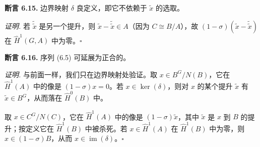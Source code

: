 \textbf{断言 6.15.} 边界映射 $\delta$ 良定义，即它不依赖于 $\tilde x$ 的选取。

\textit{证明.} 若 $\tilde{\tilde x}$ 是另一个提升，则 $\tilde x-\tilde{\tilde x}\in A$（因为 $C\cong B/A$），故 $(1-\sigma)(\tilde x-\tilde{\tilde x})$ 在 $\widehat H^1(G,A)$ 中为零。\hfill$\square$

\textbf{断言 6.16.} 序列 (6.5) 可延展为正合的。

\textit{证明.} 与前面一样，我们只在边界映射处验证。取 $x\in B^G/N(B)$，它在 $\widehat H^1(A)$ 中的像是 $(1-\sigma)x=0$。若 $x\in\ker(\delta)$，则对 $x$ 的某个提升 $\tilde x$ 有 $\tilde x\in B^G$，从而落在 $\widehat H^0(B)$ 中。

取 $x\in C^G/N(C)$，它在 $\widehat H^1(A)$ 中的像是 $(1-\sigma)\tilde x$，其中 $\tilde x$ 是 $x$ 到 $B$ 的提升；按定义它在 $\widehat H^1(B)$ 中被杀死。若 $x\in\widehat H^1(A)$ 在 $\widehat H^1(B)$ 中为零，则 $x\in(1-\sigma)B$，从而 $x\in\operatorname{im}(\delta)$。\hfill$\square$

